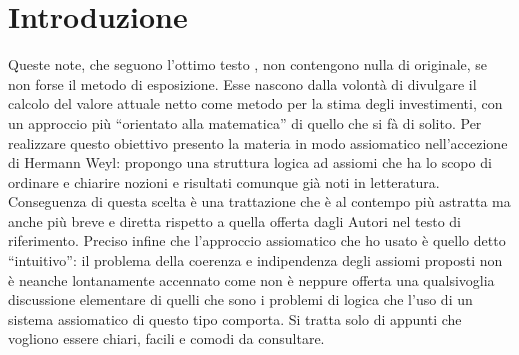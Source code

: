 \chapter*{Introduzione}

Queste note, che seguono l'ottimo testo \cite{brealey_et_al1999}, non contengono nulla di originale,
se non forse il metodo di esposizione.\newline 
Esse nascono dalla volontà di divulgare il calcolo del valore attuale netto come metodo
per la stima degli investimenti, con un approccio più ``orientato alla matematica''
di quello che si fà di solito. Per realizzare questo obiettivo presento la materia in modo assiomatico
nell'accezione di Hermann Weyl: propongo una struttura logica ad assiomi che ha lo scopo di ordinare e
chiarire nozioni e risultati comunque già noti in letteratura. Conseguenza di questa scelta è una
trattazione che è al contempo più astratta ma anche più breve e diretta rispetto a quella offerta
dagli Autori nel testo di riferimento.\newline
Preciso infine che l'approccio assiomatico che ho usato è quello detto ``intuitivo'': il problema della 
coerenza e indipendenza degli assiomi proposti non è neanche lontanamente accennato come non è neppure
offerta una qualsivoglia discussione elementare di quelli che sono i problemi di logica che l'uso
di un sistema assiomatico di questo tipo comporta. Si tratta solo di appunti che vogliono
essere chiari, facili e comodi da consultare.